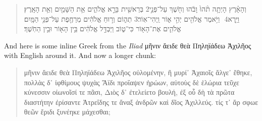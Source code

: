 \documentclass[11pt]{article}
\begin{document}
\begin{quote}
\begin{hebrew}
‏‏בְּרֵאשִׁ֖ית בָּרָ֣א אֱלֹהִ֑ים אֵ֥ת הַשָּׁמַ֖יִם וְאֵ֥ת הָאָֽרֶץ׃ ‎2‏ וְהָאָ֗רֶץ הָיְתָ֥ה תֹ֨הוּ֙ וָבֹ֔הוּ וְחֹ֖שֶׁךְ עַל־פְּנֵ֣י תְה֑וֹם וְר֣וּחַ אֱלֹהִ֔ים מְרַחֶ֖פֶת עַל־פְּנֵ֥י הַמָּֽיִם׃ ‎3‏ וַיֹּ֥אמֶר אֱלֹהִ֖ים יְהִ֣י א֑וֹר וַֽיְהִי־אֽוֹר׃ ‎4‏ וַיַּ֧רְא אֱלֹהִ֛ים אֶת־הָא֖וֹר כִּי־ט֑וֹב וַיַּבְדֵּ֣ל אֱלֹהִ֔ים בֵּ֥ין הָא֖וֹר וּבֵ֥ין הַחֹֽשֶׁךְ׃
\end{hebrew}
\end{quote}

And here is some inline Greek from the \emph{Iliad} μῆνιν ἄειδε θεὰ Πηληϊάδεω Ἀχιλῆος with English around it. And now a longer chunk:

\begin{quote}
μῆνιν ἄειδε θεὰ Πηληϊάδεω Ἀχιλῆος οὐλομένην, ἣ μυρί᾽ Ἀχαιοῖς ἄλγε᾽ ἔθηκε, πολλὰς δ᾽ ἰφθίμους ψυχὰς Ἄϊδι προΐαψεν ἡρώων, αὐτοὺς δὲ ἑλώρια τεῦχε κύνεσσιν οἰωνοῖσί τε πᾶσι, Διὸς δ᾽ ἐτελείετο βουλή, ἐξ οὗ δὴ τὰ πρῶτα διαστήτην ἐρίσαντε Ἀτρεΐδης τε ἄναξ ἀνδρῶν καὶ δῖος Ἀχιλλεύς. τίς τ᾽ ἄρ σφωε θεῶν ἔριδι ξυνέηκε μάχεσθαι;
\end{quote}
\end{document}
